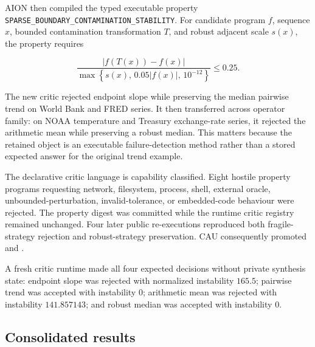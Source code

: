 AION then compiled the typed executable property
\texttt{SPARSE\_BOUNDARY\_CONTAMINATION\_STABILITY}.  For candidate program
$f$, sequence $x$, bounded contamination transformation $T$, and robust adjacent
scale $s(x)$, the property requires

\begin{equation}
\label{eq:sparse-contamination-property}
\frac{\left|f(T(x))-f(x)\right|}
{\max\!\left\{s(x),\,0.05|f(x)|,\,10^{-12}\right\}}
\leq 0.25.
\end{equation}

The new critic rejected endpoint slope while preserving the median pairwise
trend on World Bank and FRED series.  It then transferred across operator
family: on NOAA temperature and Treasury exchange-rate series, it rejected the
arithmetic mean while preserving a robust median.  This matters because the
retained object is an executable failure-detection method rather than a stored
expected answer for the original trend example.

The declarative critic language is capability classified.  Eight hostile
property programs requesting network, filesystem, process, shell, external
oracle, unbounded-perturbation, invalid-tolerance, or embedded-code behaviour
were rejected.  The property digest
\texttt{}
was committed while the runtime critic registry remained unchanged.  Four later
public re-executions reproduced both fragile-strategy rejection and
robust-strategy preservation.  CAU consequently promoted
\texttt{} and
\texttt{}.

A fresh critic runtime made all four expected decisions without private
synthesis state: endpoint slope was rejected with normalized instability
$165.5$; pairwise trend was accepted with instability $0$; arithmetic mean was
rejected with instability $141.857143$; and robust median was accepted with
instability $0$.

\subsection{Consolidated results}
\label{subsec:recursive-invention-results}

